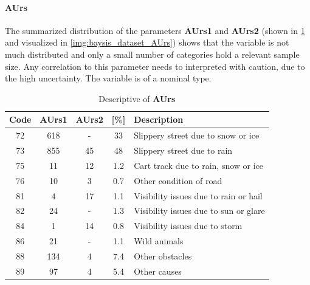 \paragraph{AUrs}
\label{baysis_dataset_AUrs}
The summarized distribution of the parameters \textbf{AUrs1} and \textbf{AUrs2} (shown in \cref{tbl:baysis_dataset_AUrs} and visualized in \cref{img:baysis_dataset_AUrs}) shows that the variable is not much distributed and only a small number of categories hold a relevant sample size. Any correlation to this parameter needs to interpreted with caution, due to the high uncertainty. The variable is of a nominal type.
\begin{table}[ht]
	\centering
	\small
	\begin{tabular}{c|c|c|c|l}
		\toprule
		Code & \textbf{AUrs1} & \textbf{AUrs2} & [\%] & Description \\ 
		\midrule
		72 & 618	& -		& 33  & Slippery street due to snow or ice \\
		73 & 855	& 45	& 48  & Slippery street due to rain \\
		75 & 11		& 12	& 1.2 & Cart track due to rain, snow or ice \\
		76 & 10		& 3		& 0.7 & Other condition of road \\
		81 & 4		& 17 	& 1.1 & Visibility issues due to rain or hail \\
		82 & 24		& -		& 1.3 & Visibility issues due to sun or glare \\
		84 & 1		& 14	& 0.8 & Visibility issues due to storm \\
		86 & 21		& -		& 1.1 & Wild animals \\
		88 & 134	& 4		& 7.4 & Other obstacles \\
		89 & 97		& 4		& 5.4 & Other causes \\
		\bottomrule
	\end{tabular}
	\caption{Descriptive of \textbf{AUrs}}
	\label{tbl:baysis_dataset_AUrs}
	\vspace{-8mm}
\end{table}
